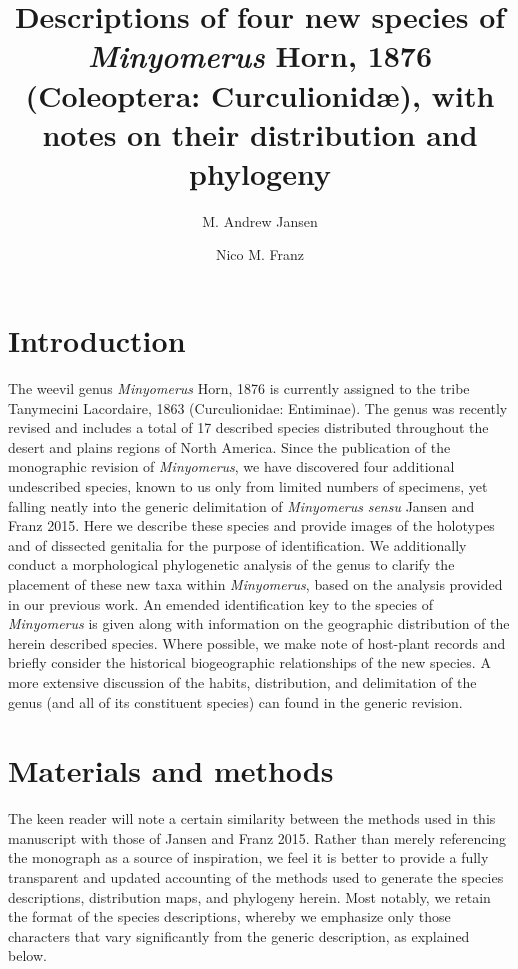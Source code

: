 \documentclass[fleqn,10pt,lineno]{wlpeerj} %
\title{Descriptions of four new species of \textit{Minyomerus} Horn, 1876 (Coleoptera: Curculionid\ae), with notes on their distribution and phylogeny}
\author[1]{M. Andrew Jansen}
\author[2]{Nico M. Franz}
\affil[1]{School of Life Sciences, 427 E Tyler Mall, PO Box 874501, Tempe, AZ 85287}
\affil[2]{ASU Natural History Collections, 734 W Alameda Dr, Tempe, AZ 85282}
\begin{document}
\flushbottom
\maketitle
\thispagestyle{empty}

\section*{Introduction}
	The weevil genus \textit{Minyomerus} Horn, 1876 is currently assigned to the tribe Tanymecini Lacordaire, 1863 (Curculionidae: Entiminae). 
	The genus was recently revised and includes a total of 17 described species distributed throughout the desert and plains regions of North America.
	Since the publication of the monographic revision of \textit{Minyomerus}, we have discovered four additional undescribed species, known to us only from limited numbers of specimens, yet falling neatly into the generic delimitation of \textit{Minyomerus} \textit{sensu} Jansen and Franz 2015.
	Here we describe these species and provide images of the holotypes and of dissected genitalia for the purpose of identification.
	We additionally conduct a morphological phylogenetic analysis of the genus to clarify the placement of these new taxa within \textit{Minyomerus}, based on the analysis provided in our previous work.
	An emended identification key to the species of \textit{Minyomerus} is given along with information on the geographic distribution of the herein described species.
	Where possible, we make note of host-plant records and briefly consider the historical biogeographic relationships of the new species.
	A more extensive discussion of the habits, distribution, and delimitation of the genus (and all of its constituent species) can found in the generic revision.
	
\section*{Materials and methods}
	The keen reader will note a certain similarity between the methods used in this manuscript with those of Jansen and Franz 2015. 
	Rather than merely referencing the monograph as a source of inspiration, we feel it is better to provide a fully transparent and updated accounting of the methods used to generate the species descriptions, distribution maps, and phylogeny herein.
	Most notably, we retain the format of the species descriptions, whereby we emphasize only those characters that vary significantly from the generic description, as explained below.
\end{document}
